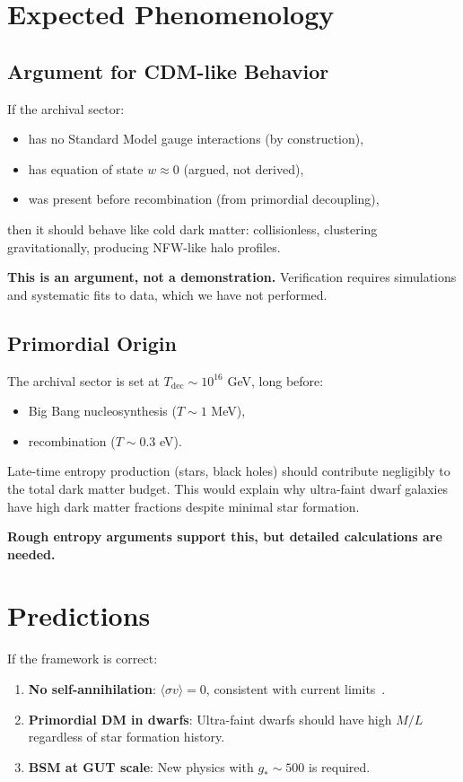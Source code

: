 \documentclass[11pt,a4paper]{article}
\begin{document}
\section{Expected Phenomenology}

\subsection{Argument for CDM-like Behavior}

If the archival sector:
\begin{itemize}
\item has no Standard Model gauge interactions (by construction),
\item has equation of state $w \approx 0$ (argued, not derived),
\item was present before recombination (from primordial decoupling),
\end{itemize}
then it should behave like cold dark matter: collisionless, clustering gravitationally, producing NFW-like halo profiles.

\textbf{This is an argument, not a demonstration.} Verification requires simulations and systematic fits to data, which we have not performed.

\subsection{Primordial Origin}

The archival sector is set at $T_{\mathrm{dec}} \sim 10^{16}$ GeV, long before:
\begin{itemize}
\item Big Bang nucleosynthesis ($T \sim 1$ MeV),
\item recombination ($T \sim 0.3$ eV).
\end{itemize}

Late-time entropy production (stars, black holes) should contribute negligibly to the total dark matter budget. This would explain why ultra-faint dwarf galaxies have high dark matter fractions despite minimal star formation.

\textbf{Rough entropy arguments support this, but detailed calculations are needed.}

\section{Predictions}

If the framework is correct:

\begin{enumerate}
\item \textbf{No self-annihilation}: $\langle\sigma v\rangle = 0$, consistent with current limits~\citep{FermiDwarfs2015}.

\item \textbf{Primordial DM in dwarfs}: Ultra-faint dwarfs should have high $M/L$ regardless of star formation history.

\item \textbf{BSM at GUT scale}: New physics with $g_* \sim 500$ is required.
\end{enumerate}
\end{document}

